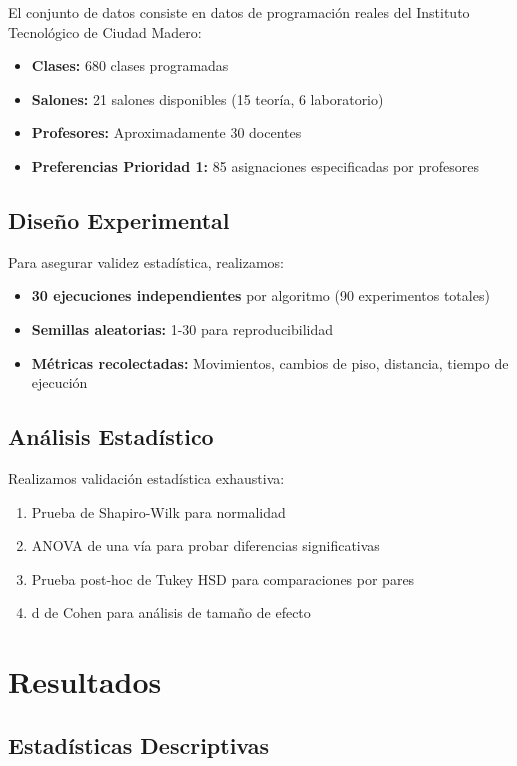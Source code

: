 \documentclass[12pt,a4paper]{article}
\begin{document}
El conjunto de datos consiste en datos de programación reales del Instituto Tecnológico de Ciudad Madero:
\begin{itemize}
\item \textbf{Clases:} 680 clases programadas
\item \textbf{Salones:} 21 salones disponibles (15 teoría, 6 laboratorio)
\item \textbf{Profesores:} Aproximadamente 30 docentes
\item \textbf{Preferencias Prioridad 1:} 85 asignaciones especificadas por profesores
\end{itemize}

\subsection{Diseño Experimental}

Para asegurar validez estadística, realizamos:
\begin{itemize}
\item \textbf{30 ejecuciones independientes} por algoritmo (90 experimentos totales)
\item \textbf{Semillas aleatorias:} 1-30 para reproducibilidad
\item \textbf{Métricas recolectadas:} Movimientos, cambios de piso, distancia, tiempo de ejecución
\end{itemize}

\subsection{Análisis Estadístico}

Realizamos validación estadística exhaustiva:
\begin{enumerate}
\item Prueba de Shapiro-Wilk para normalidad
\item ANOVA de una vía para probar diferencias significativas
\item Prueba post-hoc de Tukey HSD para comparaciones por pares
\item d de Cohen para análisis de tamaño de efecto
\end{enumerate}

\section{Resultados}

\subsection{Estadísticas Descriptivas}
\end{document}
